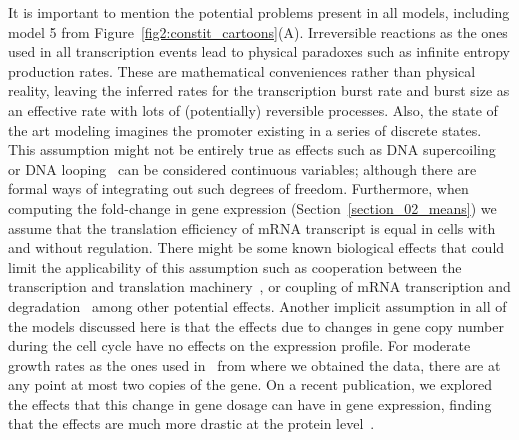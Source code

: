 It is important to mention the potential problems present in all models,
including model 5 from Figure~\ref{fig2:constit_cartoons}(A). Irreversible
reactions as the ones used in all transcription events lead to physical
paradoxes such as infinite entropy production rates. These are mathematical
conveniences rather than physical reality, leaving the inferred rates for the
transcription burst rate and burst size as an effective rate with lots of
(potentially) reversible processes. Also, the state of the art modeling imagines
the promoter existing in a series of discrete states. This assumption might not
be entirely true as effects such as DNA supercoiling~\cite{Chong2014,Sevier2016}
or DNA looping~\cite{Boedicker2013a} can be considered continuous
variables; although there are formal ways of integrating out such degrees of
freedom. Furthermore, when computing the fold-change in gene expression
(Section~\ref{section_02_means}) we assume that the translation efficiency of
mRNA transcript is equal in cells with and without regulation. There might be
some known biological effects that could limit the applicability of this
assumption such as cooperation between the transcription and translation 
machinery~\cite{Proshkin2010}, or coupling of mRNA transcription and 
degradation~\cite{Chen2015} among other potential effects. Another implicit 
assumption in all of the models discussed here is that the effects due to 
changes in gene copy number during the cell cycle have no effects on the 
expression profile. For moderate growth rates as the ones used 
in~\cite{Jones2014} from where we obtained the data, there are at any point at
most two copies of the gene. On a recent publication, we explored the effects
that this change in gene dosage can have in gene expression, finding that the
effects are much more drastic at the protein level~\cite{Razo-Mejia2020}.

